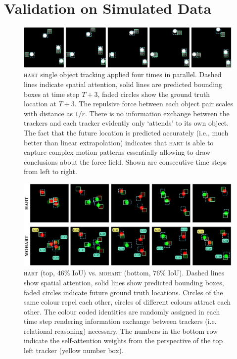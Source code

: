 \section{Validation on Simulated Data} %
\label{sec:experiment_toy}

\begin{figure}%
    \centering
    \includegraphics[width=0.99\textwidth]{figures/MOHART/sot_protons}
    \vspace{-3mm}
    \caption{\textsc{hart} single object tracking applied four times in parallel. Dashed lines indicate spatial attention, solid lines are predicted bounding boxes at time step $T+3$, faded circles show the ground truth location at $T+3$. The repulsive force between each object pair scales with distance as $1/r$. There is no information exchange between the trackers and each tracker evidently only `attends' to its own object. The fact that the future location is predicted accurately (i.e., much better than linear extrapolation) indicates that \textsc{hart} is able to capture complex motion patterns essentially allowing to draw conclusions about the force field. Shown are consecutive time steps from left to right.
    }
    \label{fig:toy1}
\end{figure} 
\begin{figure}%
    \centering
    \includegraphics[width=0.99\textwidth]{figures/MOHART/mot_proel}
    \vspace{-3mm}
    \caption{\textsc{hart} (top, $46\%$ IoU) vs. \textsc{mohart} (bottom, $76\%$ IoU). Dashed lines show spatial attention, solid lines show predicted bounding boxes, faded circles indicate future ground truth locations. Circles of the same colour repel each other, circles of different colours attract each other. The colour coded identities are randomly assigned in each time step rendering information exchange between trackers (i.e. relational reasoning) necessary. The numbers in the bottom row indicate the self-attention weights from the perspective of the top left tracker (yellow number box).
    \vspace{-3mm}
    }
    \label{fig:toy2}
\end{figure}



